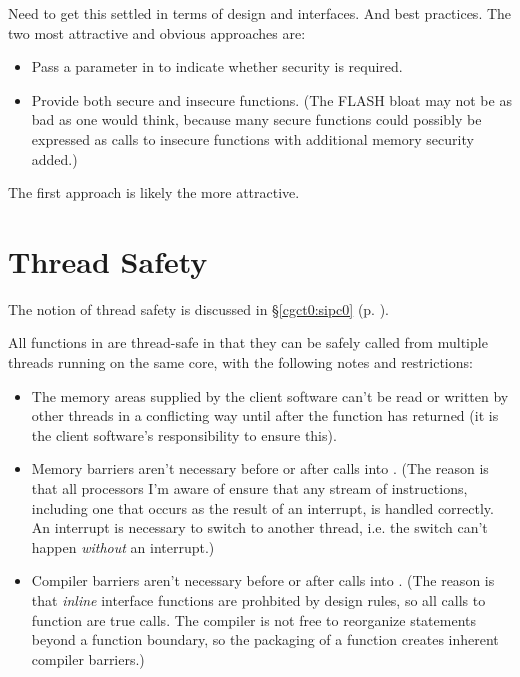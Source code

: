 Need to get this settled in terms of design and interfaces.
And best practices.
The two most attractive and obvious approaches are:

\begin{itemize}
\item Pass a parameter in to indicate whether security
      is required.
\item Provide both secure and insecure functions.  (The
      FLASH bloat may not be as bad as one would think,
      because many secure functions could possibly
      be 
      expressed as calls to insecure functions with 
      additional memory security added.)
\end{itemize}

The first approach is likely the more attractive.


\section{Thread Safety}
\label{cldd0:stsf0}

The notion of thread safety is discussed 
in \S{}\ref{cgct0:sipc0} (p.  \pageref{cgct0:sipc0}).  

All functions in \emph{\productbasenameshort{}} are 
thread-safe in that they can be safely called from multiple 
threads running on the same core, with the following notes 
and restrictions: 

\begin{itemize}
\item The memory areas supplied by the client software
      can't be read or written by other threads in a 
      conflicting way until after the
      \emph{\productbasenameshort{}} function has returned
      (it is the client software's responsibility to ensure 
      this).
\item Memory barriers aren't necessary before or after calls
      into \emph{\productbasenameshort{}}\@.  (The reason is 
      that all processors I'm aware of ensure that any 
      stream of instructions, including one that
      occurs as the result of an interrupt, is handled
      correctly.  An interrupt is necessary to switch to 
      another thread, i.e. the switch can't happen
      \emph{without} an interrupt.)
\item Compiler barriers aren't necessary before or after
      calls into \emph{\productbasenameshort{}}\@.  (The  
      reason is that \emph{inline} 
      interface functions are prohbited by 
      \emph{\productbasenameshort{}} design rules, so all
      calls to \emph{\productbasenameshort{}} function
      are true calls.  The compiler is not free to 
      reorganize statements beyond a function
      boundary, so the packaging of a function creates
      inherent compiler barriers.)
\end{itemize}

